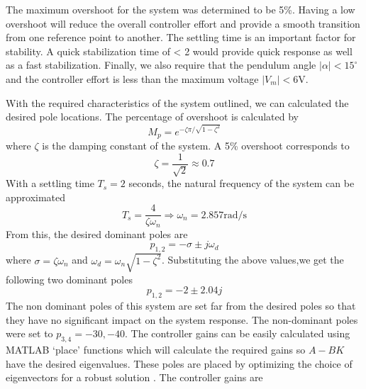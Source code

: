 \documentclass[superscriptaddress,floatfix,reprint,amssymb, amsmath,aps, pre]{revtex4-1}
\begin{document}
{{{            The maximum overshoot for the system was determined to be 5\%. Having a low overshoot will reduce the overall controller effort and provide a smooth transition from one reference point to another. The settling time is an important factor for stability. A quick stabilization time of < 2 would provide quick response as well as a fast stabilization. Finally, we also require that the pendulum angle \(|\alpha| < 15^\circ\) and the controller effort is less than the maximum voltage \(|V_m| < 6\)V.
        }
        
        With the required characteristics of the system outlined, we can calculated the desired pole locations. The percentage of overshoot is calculated by 
        \begin{equation}
            M_p = e^{-\zeta \pi / \sqrt{1-\zeta^{2}}}
        \end{equation}
        where \(\zeta\) is the damping constant of the system. A 5\% overshoot corresponds to 
        \begin{equation}
            \zeta = \frac{1}{\sqrt{2}} \approx 0.7 
        \end{equation}
        With a settling time \(T_s = 2\) seconds, the natural frequency of the system can be approximated 
        \begin{equation}
            T_s = \frac{4}{\zeta \omega_n} \Rightarrow \omega_n = 2.857 \text{rad/s}
        \end{equation}
        From this, the desired dominant poles are 
        \begin{equation}
            p_{1,2}=-\sigma \pm j \omega_{d}
        \end{equation}
        where \(\sigma = \zeta \omega_n\) and \(\omega_d = \omega_n \sqrt{1-\zeta^2}\). Substituting the above values,we get the following two dominant poles 
        \begin{equation}
            p_{1,2} = -2 \pm 2.04 j
        \end{equation}
        The non dominant poles of this system are set far from the desired poles so that they have no significant impact on the system response. The non-dominant poles were set to \(p_{3,4}=-30,-40\). The controller gains can be easily calculated using MATLAB `place' functions which will calculate the required gains so \(A-BK\) have the desired eigenvalues. These poles are placed by optimizing the choice of eigenvectors for a robust solution \cite{kautsky_robust_1985}. The controller gains are 
        \begin{equation}

\end{equation}}}
\end{document}
